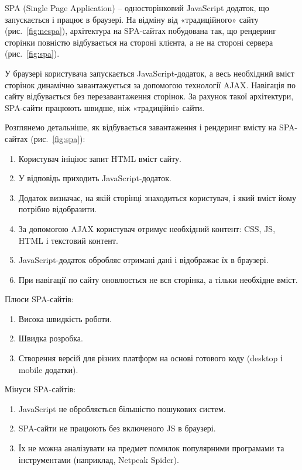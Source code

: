 SPA (Single Page Application) -- односторінковий JavaScript додаток, що запускається і працює в браузері. На відміну від «традиційного» сайту (рис.~\ref{fig:nespa}), архітектура на SPA-сайтах побудована так, що рендеринг сторінки повністю відбувається на стороні клієнта, а не на стороні сервера (рис.~\ref{fig:spa}).

У браузері користувача запускається JavaScript-додаток, а весь необхідний вміст сторінок динамічно завантажується за допомогою технології AJAX. Навігація по сайту відбувається без перезавантаження сторінок. За рахунок такої архітектури, SPA-сайти працюють швидше, ніж «традиційні» сайти.



Розглянемо детальніше, як відбувається завантаження і рендеринг вмісту на SPA-сайтах (рис.~\ref{fig:spa}):

\begin{enumerate}
  \item Користувач ініціює запит HTML вміст сайту.
  \item У відповідь приходить JavaScript-додаток.
  \item Додаток визначає, на якій сторінці знаходиться користувач, і який вміст йому потрібно відобразити.
  \item За допомогою AJAX користувач отримує необхідний контент: CSS, JS, HTML і текстовий контент.
  \item JavaScript-додаток обробляє отримані дані і відображає їх в браузері.
  \item При навігації по сайту оновлюється не вся сторінка, а тільки необхідне вміст.
\end{enumerate}

Плюси SPA-сайтів:

\begin{enumerate}
  \item Висока швидкість роботи.
  \item Швидка розробка.
  \item Створення версій для різних платформ на основі готового коду (desktop і mobile додатки).
\end{enumerate}

Мінуси SPA-сайтів:

\begin{enumerate}
  \item JavaScript не обробляється більшістю пошукових систем.
  \item SPA-сайти не працюють без включеного JS в браузері.
  \item Їх не можна аналізувати на предмет помилок популярними програмами та інструментами (наприклад, Netpeak Spider).
\end{enumerate}